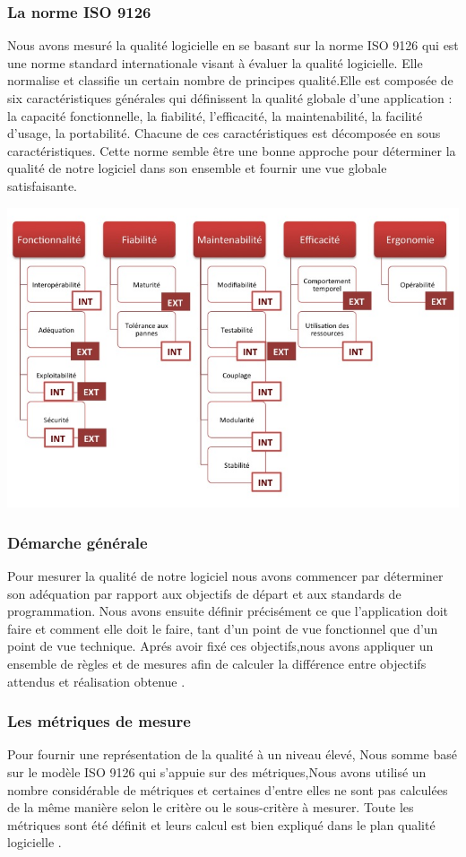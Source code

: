 \documentclass{scrartcl}
\begin{document}
\subsubsection{La norme ISO 9126}
Nous avons mesuré la qualité logicielle en se basant sur la norme ISO 9126 qui est une norme standard internationale visant à évaluer
la qualité logicielle. Elle normalise et classifie un certain nombre de principes qualité.Elle est composée de six caractéristiques générales qui définissent la qualité globale d'une application : la capacité fonctionnelle, la fiabilité, l'efficacité, la maintenabilité, la facilité d'usage, la portabilité. Chacune de ces caractéristiques est décomposée en sous caractéristiques.
Cette norme semble être une bonne approche pour déterminer la qualité de notre logiciel dans son ensemble et fournir une vue globale satisfaisante.

 \begin{center}
 	\includegraphics[width=0.60\columnwidth]{iso9126}
 	\label{fig-label}
 \end{center}
\subsubsection{Démarche générale}
Pour mesurer la qualité de notre logiciel nous avons commencer par déterminer son adéquation par rapport aux objectifs de départ et aux standards de programmation. Nous avons ensuite définir précisément ce que l’application doit faire et comment elle doit le faire, tant d’un point de vue fonctionnel que d’un point de vue technique. Aprés avoir fixé ces objectifs,nous avons appliquer un ensemble de règles et de mesures afin de calculer la différence entre objectifs attendus et réalisation obtenue .
 
\subsubsection{Les métriques de mesure}
Pour fournir une représentation de la qualité à un niveau élevé, Nous somme basé sur le modèle ISO 9126 qui s'appuie sur des métriques,Nous avons utilisé un nombre considérable de métriques et certaines d’entre elles ne sont pas calculées de la même manière selon le critère ou le sous-critère à mesurer. Toute les métriques sont été définit et leurs calcul est bien expliqué dans le plan qualité logicielle .
\end{document}
